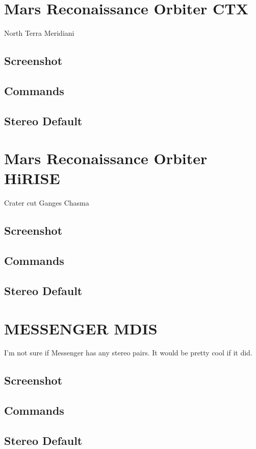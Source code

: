 \section{Mars Reconaissance Orbiter CTX}

North Terra Meridiani

\subsection{Screenshot}

\subsection{Commands}

\subsection{Stereo Default}

\section{Mars Reconaissance Orbiter HiRISE}

Crater cut Ganges Chasma

\subsection{Screenshot}

\subsection{Commands}

\subsection{Stereo Default}

\section{MESSENGER MDIS}

I'm not sure if Messenger has any stereo pairs. It would be pretty
cool if it did.

\subsection{Screenshot}

\subsection{Commands}

\subsection{Stereo Default}
